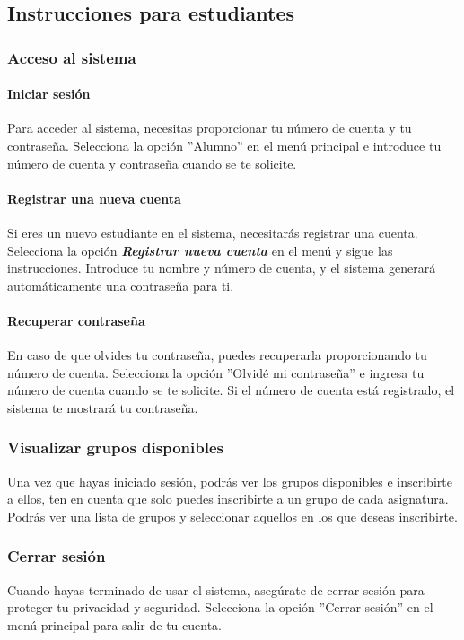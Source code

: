 \documentclass[a4paper,12pt]{article}
\begin{document}
\subsection{Instrucciones para estudiantes}

\subsubsection{Acceso al sistema}

\paragraph{Iniciar sesión}
Para acceder al sistema, necesitas proporcionar tu número de cuenta y tu contraseña. Selecciona la opción ''Alumno'' en el menú principal e introduce tu número de cuenta y contraseña cuando se te solicite.

\paragraph{Registrar una nueva cuenta}
Si eres un nuevo estudiante en el sistema, necesitarás registrar una cuenta. Selecciona la opción \textit{\textbf{Registrar nueva cuenta}} en el menú y sigue las instrucciones. Introduce tu nombre y número de cuenta, y el sistema generará automáticamente una contraseña para ti.

\paragraph{Recuperar contraseña}
En caso de que olvides tu contraseña, puedes recuperarla proporcionando tu número de cuenta. Selecciona la opción ''Olvidé mi contraseña'' e ingresa tu número de cuenta cuando se te solicite. Si el número de cuenta está registrado, el sistema te mostrará tu contraseña.

\subsubsection{Visualizar grupos disponibles}
Una vez que hayas iniciado sesión, podrás ver los grupos disponibles e inscribirte a ellos, ten en cuenta que solo puedes inscribirte a un grupo de cada asignatura. Podrás ver una lista de grupos y seleccionar aquellos en los que deseas inscribirte.

\subsubsection{Cerrar sesión}
Cuando hayas terminado de usar el sistema, asegúrate de cerrar sesión para proteger tu privacidad y seguridad. Selecciona la opción ''Cerrar sesión'' en el menú principal para salir de tu cuenta.
\end{document}
